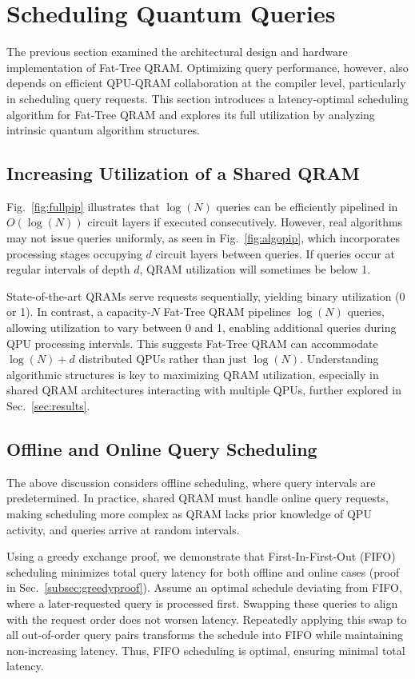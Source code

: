 \section{Scheduling Quantum Queries}
\label{sec:schedule}

The previous section examined the architectural design and hardware implementation of Fat-Tree QRAM. Optimizing query performance, however, also depends on efficient QPU-QRAM collaboration at the compiler level, particularly in scheduling query requests. This section introduces a latency-optimal scheduling algorithm for Fat-Tree QRAM and explores its full utilization by analyzing intrinsic quantum algorithm structures.

\subsection{Increasing Utilization of a Shared QRAM}

Fig.~\ref{fig:fullpip} illustrates that $\log(N)$ queries can be efficiently pipelined in $O(\log(N))$ circuit layers if executed consecutively. However, real algorithms may not issue queries uniformly, as seen in Fig.~\ref{fig:algopip}, which incorporates processing stages occupying $d$ circuit layers between queries. If queries occur at regular intervals of depth $d$, QRAM utilization will sometimes be below 1.

State-of-the-art QRAMs serve requests sequentially, yielding binary utilization (0 or 1). In contrast, a capacity-$N$ Fat-Tree QRAM pipelines $\log(N)$ queries, allowing utilization to vary between 0 and 1, enabling additional queries during QPU processing intervals. This suggests Fat-Tree QRAM can accommodate $\log(N)+d$ distributed QPUs rather than just $\log(N)$. Understanding algorithmic structures is key to maximizing QRAM utilization, especially in shared QRAM architectures interacting with multiple QPUs, further explored in Sec.~\ref{sec:results}.

\subsection{Offline and Online Query Scheduling}

The above discussion considers offline scheduling, where query intervals are predetermined. In practice, shared QRAM must handle online query requests, making scheduling more complex as QRAM lacks prior knowledge of QPU activity, and queries arrive at random intervals.

Using a greedy exchange proof, we demonstrate that First-In-First-Out (FIFO) scheduling minimizes total query latency for both offline and online cases (proof in Sec.~\ref{subsec:greedyproof}). Assume an optimal schedule deviating from FIFO, where a later-requested query is processed first. Swapping these queries to align with the request order does not worsen latency. Repeatedly applying this swap to all out-of-order query pairs transforms the schedule into FIFO while maintaining non-increasing latency. Thus, FIFO scheduling is optimal, ensuring minimal total latency.


